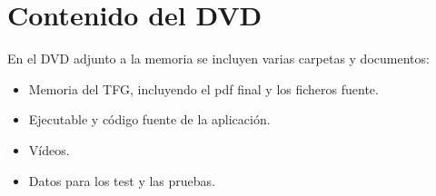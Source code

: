 \chapter{Contenido del DVD}
En el DVD adjunto a la memoria se incluyen varias carpetas y documentos:
 \begin{itemize}
 	\item Memoria del TFG, incluyendo el pdf final y los ficheros fuente.
 	\item Ejecutable y código fuente de la aplicación.
 	\item Vídeos.
 	\item Datos para los test y las pruebas.
 \end{itemize}
